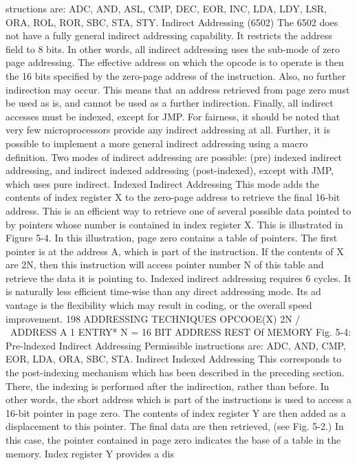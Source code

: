 \documentclass{book}
\begin{document}
structions are: ADC, AND, ASL, CMP, DEC, EOR, INC, LDA,
LDY, LSR, ORA, ROL, ROR, SBC, STA, STY.
Indirect Addressing (6502)
The 6502 does not have a fully general indirect addressing
capability. It restricts the address field to 8 bits. In other words,
all indirect addressing uses the sub-mode of zero page addressing.
The effective address on which the opcode is to operate is then the
16 bits specified by the zero-page address of the instruction. Also,
no further indirection may occur. This means that an address
retrieved from page zero must be used as is, and cannot be used as
a further indirection.
Finally, all indirect accesses must be indexed, except for JMP.
For fairness, it should be noted that very few microprocessors
provide any indirect addressing at all. Further, it is possible to
implement a more general indirect addressing using a macro
definition.
Two modes of indirect addressing are possible: (pre) indexed indirect
addressing, and indirect indexed addressing (post-indexed), except
with JMP, which uses pure indirect.
Indexed Indirect Addressing
This mode adds the contents of index register X to the zero-page
address to retrieve the final 16-bit address. This is an efficient way to
retrieve one of several possible data pointed to by pointers whose
number is contained in index register X. This is illustrated in Figure
5-4.
In this illustration, page zero contains a table of pointers. The
first pointer is at the address A, which is part of the instruction. If
the contents of X are 2N, then this instruction will access pointer
number N of this table and retrieve the data it is pointing to.
Indexed indirect addressing requires 6 cycles. It is naturally
less efficient time-wise than any direct addressing mode. Its ad
vantage is the flexibility which may result in coding, or the overall
speed improvement.
198
ADDRESSING TECHNIQUES
OPCOOE(X)
2N
/
\
ADDRESS A
1
ENTRY* N
= 16 BIT ADDRESS
REST Of
MEMORY
Fig. 5-4: Pre-lndexed Indirect Addressing
Permissible instructions are: ADC, AND, CMP, EOR, LDA,
ORA, SBC, STA.
Indirect Indexed Addressing
This corresponds to the post-indexing mechanism which has
been described in the preceding section. There, the indexing is
performed after the indirection, rather than before. In other
words, the short address which is part of the instructions is used
to access a 16-bit pointer in page zero. The contents of index
register Y are then added as a displacement to this pointer. The
final data are then retrieved, (see Fig. 5-2.)
In this case, the pointer contained in page zero indicates the
base of a table in the memory. Index register Y provides a dis
\end{document}
